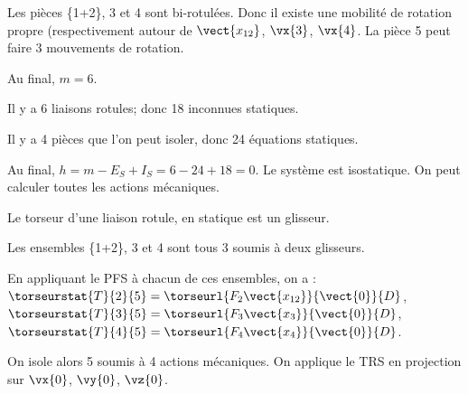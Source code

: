 \ifprof
\begin{corrige}
Les pièces \{1+2\}, 3 et 4 sont bi-rotulées. Donc il existe une mobilité de rotation propre (respectivement autour de $\vect{x_{12}}$, $\vx{3}$, $\vx{4}$.
La pièce 5 peut faire 3 mouvements de rotation.

Au final, $m=6$.

Il y a 6 liaisons rotules; donc 18 inconnues statiques. 

Il y a 4 pièces que l'on peut isoler, donc 24 équations statiques. 

Au final, $h = m-E_S+I_S = 6 -24 + 18 = 0$. Le système est isostatique. On peut calculer toutes les actions mécaniques.

\vspace{.5cm}

Le torseur d'une liaison rotule, en statique est un glisseur. 

Les ensembles \{1+2\}, 3 et 4 sont tous 3 soumis à deux glisseurs. 

En appliquant le PFS à chacun de ces ensembles, on a : 
$\torseurstat{T}{2}{5} = \torseurl{F_2\vect{x_{12}}}{\vect{0}}{D}$,
$\torseurstat{T}{3}{5} = \torseurl{F_3\vect{x_3}}{\vect{0}}{D}$,
$\torseurstat{T}{4}{5} = \torseurl{F_4\vect{x_4}}{\vect{0}}{D}$.

On isole alors 5 soumis à 4 actions mécaniques. 
On applique le TRS en projection sur $\vx{0}$, $\vy{0}$, $\vz{0}$. 
\end{corrige}
\else
\fi



